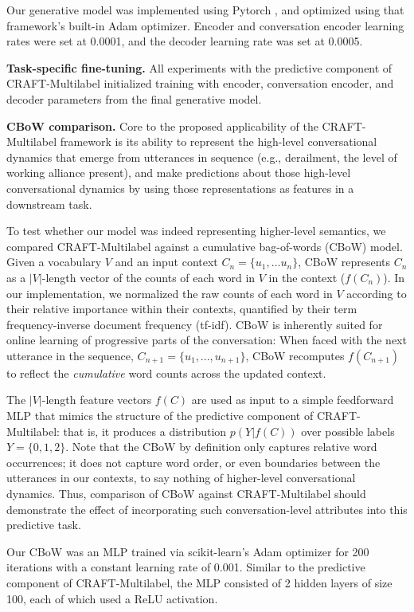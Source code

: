 \documentclass{article}
\begin{document}
Our generative model was implemented using Pytorch \cite{paszke2019pytorch}, and optimized using that framework's built-in Adam optimizer. Encoder and conversation encoder learning rates were set at 0.0001, and the decoder learning rate was set at 0.0005. 

\textbf{Task-specific fine-tuning.} All experiments with the predictive component of CRAFT-Multilabel initialized training with encoder, conversation encoder, and decoder parameters from the final generative model. 

\textbf{CBoW comparison.} Core to the proposed applicability of the CRAFT-Multilabel framework is its ability to represent the high-level conversational dynamics that emerge from utterances in sequence (e.g., derailment, the level of working alliance present), and make predictions about those high-level conversational dynamics by using those representations as features in a downstream task. 

To test whether our model was indeed representing higher-level semantics, we compared CRAFT-Multilabel against a cumulative bag-of-words (CBoW) model. Given a vocabulary $V$ and an input context $C_n=\{u_1,...u_n\}$, CBoW represents $C_n$ as a $|V|$-length vector of the counts of each word in $V$ in the context ($f(C_n)$). In our implementation, we normalized the raw counts of each word in $V$ according to their relative importance within their contexts, quantified by their term frequency-inverse document frequency (tf-idf). CBoW is inherently suited for online learning of progressive parts of the conversation: When faced with the next utterance in the sequence, $C_{n+1}=\{u_1,...,u_{n+1}\}$, CBoW recomputes $f(C_{n+1})$ to reflect the \textit{cumulative} word counts across the updated context.

The $|V|$-length feature vectors $f(C)$ are used as input to a simple feedforward MLP that mimics the structure of the predictive component of CRAFT-Multilabel: that is, it produces a distribution $p(Y|f(C))$ over possible labels $Y=\{0,1,2\}$. Note that the CBoW by definition only captures relative word occurrences; it does not capture word order, or even boundaries between the utterances in our contexts, to say nothing of higher-level conversational dynamics. Thus, comparison of CBoW against CRAFT-Multilabel should demonstrate the effect of incorporating such conversation-level attributes into this predictive task.

Our CBoW was an MLP trained via scikit-learn's Adam optimizer \cite{scikit-learn} for 200 iterations with a constant learning rate of 0.001. Similar to the predictive component of CRAFT-Multilabel, the MLP consisted of 2 hidden layers of size 100, each of which used a ReLU activation.
\end{document}
